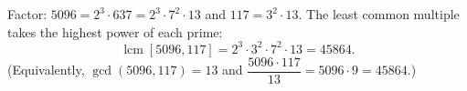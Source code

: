 Factor: $5096=2^3\cdot637=2^3\cdot7^2\cdot13$ and $117=3^2\cdot13$. The least common multiple takes the highest power of each prime:
\[
\operatorname{lcm}[5096,117]=2^3\cdot3^2\cdot7^2\cdot13=\boxed{45864}.
\]
(Equivalently, $\gcd(5096,117)=13$ and $\dfrac{5096\cdot117}{13}=5096\cdot9=45864$.)
